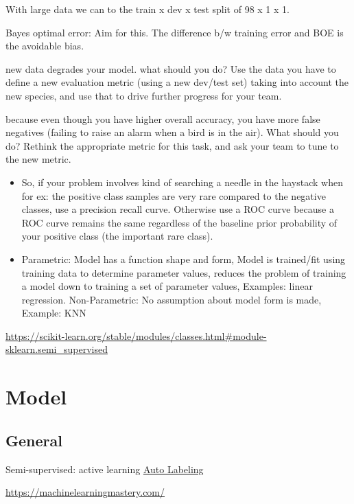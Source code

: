 \documentclass[]{book}
\begin{document}
With large data we can to the train x dev x test split of 98 x 1 x 1.

Bayes optimal error: Aim for this. The difference b/w training error and BOE is the avoidable bias.

new data degrades your model. what should you do? Use the data you have to define a new evaluation metric (using a new dev/test set) taking into account the new species, and use that to drive further progress for your team.

because even though you have higher overall accuracy, you have more false negatives (failing to raise an alarm when a bird is in the air). What should you do? Rethink the appropriate metric for this task, and ask your team to tune to the new metric.

\begin{itemize}
\item
  So, if your problem involves kind of searching a needle in the haystack when for ex: the positive class samples are very rare compared to the negative classes, use a precision recall curve. Otherwise use a ROC curve because a ROC curve remains the same regardless of the baseline prior probability of your positive class (the important rare class).
\item
  Parametric: Model has a function shape and form, Model is trained/fit using training data to determine parameter values, reduces the problem of training a model down to training a set of parameter values, Examples: linear regression. Non-Parametric: No assumption about model form is made, Example: KNN
\end{itemize}

\url{https://scikit-learn.org/stable/modules/classes.html\#module-sklearn.semi_supervised}

\hypertarget{model-1}{%
\section{Model}\label{model-1}}

\hypertarget{general-4}{%
\subsection{General}\label{general-4}}

Semi-supervised: active learning \textbar{} \href{https://blog.fastforwardlabs.com/2018/09/28/snorkel-rapid-training-data-creation-with-weak-supervision.html}{Auto Labeling}

\url{https://machinelearningmastery.com/}
\end{document}
